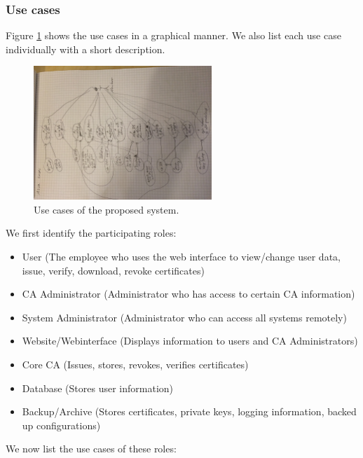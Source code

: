 \documentclass[a4paper, toc=index, 12pt, DIV14, twoside, BCOR2cm, headsepline, numbers=noenddot, bibliography=totoc]{scrbook}
\begin{document}
\subsubsection{Use cases}
Figure \ref{usecase} shows the use cases in a graphical manner. We also list each use case individually with a short description.
\begin{figure}[H]
  \centering
    \includegraphics[width=0.6\textwidth]{images/usecase.jpg}  
  \caption{Use cases of the proposed system.}
  \label{usecase}
\end{figure}
We first identify the participating roles:
\begin{itemize}
\item User (The employee who uses the web interface to view/change user data, issue, verify, download, revoke certificates)
\item CA Administrator (Administrator who has access to certain CA information)
\item System Administrator (Administrator who can access all systems remotely)
\item Website/Webinterface (Displays information to users and CA Administrators)
\item Core CA (Issues, stores, revokes, verifies certificates)
\item Database (Stores user information)
\item Backup/Archive (Stores certificates, private keys, logging information, backed up configurations)
\end{itemize}
We now list the use cases of these roles:
\end{document}
